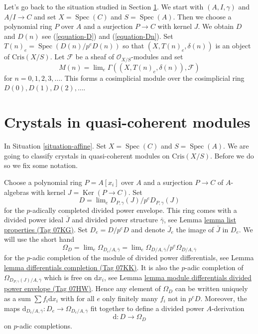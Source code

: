 \documentclass{amsart}
\theoremstyle{plain}
\theoremstyle{definition}
\theoremstyle{remark}
\numberwithin{equation}{subsection}
\def\lim{\mathop{\mathrm{lim}}\nolimits}
\def\Spec{\mathop{\mathrm{Spec}}}
\def\Ker{\mathop{\mathrm{Ker}}}
\begin{document}
\noindent
Let's go back to the situation studied in
Section \ref{section-quasi-coherent-crystals}. We
start with $(A, I, \gamma)$ and $A/I \to C$ and set
$X = \Spec(C)$ and $S = \Spec(A)$. Then we choose
a polynomial ring $P$ over $A$ and a surjection $P \to C$ with
kernel $J$. We obtain $D$ and $D(n)$ see
(\ref{equation-D}) and (\ref{equation-Dn}).
Set $T(n)_e = \Spec(D(n)/p^eD(n))$ so that
$(X, T(n)_e, \delta(n))$ is an object of $\text{Cris}(X/S)$.
Let $\mathcal{F}$ be a sheaf of $\mathcal{O}_{X/S}$-modules and set
$$
M(n) = \lim_e \Gamma((X, T(n)_e, \delta(n)), \mathcal{F})
$$
for $n = 0, 1, 2, 3, \ldots$. This forms a cosimplicial module
over the cosimplicial ring $D(0), D(1), D(2), \ldots$.



\section{Crystals in quasi-coherent modules}
\label{section-quasi-coherent-crystals}

\noindent
In Situation \ref{situation-affine}.
Set $X = \Spec(C)$ and $S = \Spec(A)$. We are going to
classify crystals in quasi-coherent modules on $\text{Cris}(X/S)$.
Before we do so we fix some notation.

\medskip\noindent
Choose a polynomial ring $P = A[x_i]$ over $A$ and a surjection $P \to C$
of $A$-algebras with kernel $J = \Ker(P \to C)$. Set
\begin{equation}
\label{equation-D}
D = \lim_e D_{P, \gamma}(J) / p^eD_{P, \gamma}(J)
\end{equation}
for the $p$-adically completed divided power envelope.
This ring comes with a divided power ideal $\bar J$ and divided power
structure $\bar \gamma$, see Lemma \href{https://stacks.math.columbia.edu/tag/07KG}{lemma list properties (Tag 07KG)}.
Set $D_e = D/p^eD$ and denote $\bar J_e$ the image of $\bar J$ in $D_e$.
We will use the short hand
\begin{equation}
\label{equation-omega-D}
\Omega_D = \lim_e \Omega_{D_e/A, \bar\gamma} =
\lim_e \Omega_{D/A, \bar\gamma}/p^e\Omega_{D/A, \bar\gamma}
\end{equation}
for the $p$-adic completion of the module of divided power differentials,
see Lemma \href{https://stacks.math.columbia.edu/tag/07KK}{lemma differentials completion (Tag 07KK)}.
It is also the $p$-adic completion of
$\Omega_{D_{P, \gamma}(J)/A, \bar\gamma}$
which is free on $\text{d}x_i$, see
Lemma \href{https://stacks.math.columbia.edu/tag/07HW}{lemma module differentials divided power envelope (Tag 07HW)}.
Hence any element of $\Omega_D$ can be written uniquely as a sum
$\sum f_i\text{d}x_i$ with for all $e$ only finitely many $f_i$
not in $p^eD$. Moreover, the maps
$\text{d}_{D_e/A, \bar\gamma} : D_e \to \Omega_{D_e/A, \bar\gamma}$
fit together to define a divided power $A$-derivation
\begin{equation}
\label{equation-derivation-D}
\text{d} : D \longrightarrow \Omega_D
\end{equation}
on $p$-adic completions.
\end{document}
